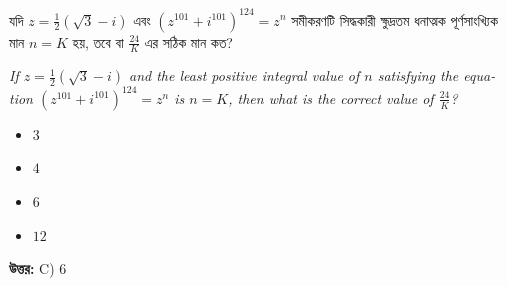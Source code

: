 \documentclass[12pt, a4paper]{article}
\begin{document}
\vspace{1em}

\begin{tcolorbox}[questionbox={প্রশ্ন (Question) 20}]
    \noindent
    যদি $z = \frac{1}{2}(\sqrt{3} - i)$ এবং $(z^{101} + i^{101})^{124} = z^n$ সমীকরণটি সিদ্ধকারী ক্ষুদ্রতম ধনাত্মক পূর্ণসাংখ্যিক মান $n = K$ হয়, তবে বা $\frac{24}{K}$ এর সঠিক মান কত?
    
    \vspace{0.8em}
    \begin{english}
    \noindent\textit{\color{darkgray}
    If $z = \frac{1}{2}(\sqrt{3} - i)$ and the least positive integral value of $n$ satisfying the equation $(z^{101} + i^{101})^{124} = z^n$ is $n = K$, then what is the correct value of $\frac{24}{K}$?
    }
    \end{english}
\end{tcolorbox}

\begin{itemize}[label={}, leftmargin=1cm, itemsep=0.5em]
    \item[\textbf{A)}] $3$
    \item[\textbf{B)}] $4$
    \item[\textbf{C)}] $6$
    \item[\textbf{D)}] $12$
\end{itemize}

\vspace{0.5em}
\begin{tcolorbox}[answerbox]
    \textbf{\color{success} উত্তর:} C) $6$
\end{tcolorbox}
\vspace{1em}
\end{document}
